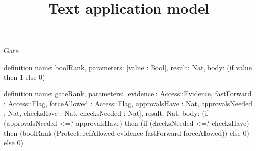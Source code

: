 \begin{lexlean}{Gate}
\title{Text application model}
\begin{semanticmodule}
definition{
  name: boolRank,
  parameters: [value : Bool],
  result: Nat,
  body: (if value then 1 else 0)
}

definition{
  name: gateRank,
  parameters: [evidence : Access::Evidence, fastForward : Access::Flag, forceAllowed : Access::Flag, approvalsHave : Nat, approvalsNeeded : Nat, checksHave : Nat, checksNeeded : Nat],
  result: Nat,
  body: (if (approvalsNeeded <=? approvalsHave) then (if (checksNeeded <=? checksHave) then (boolRank (Protect::refAllowed evidence fastForward forceAllowed)) else 0) else 0)
}
\end{semanticmodule}
\end{lexlean}
